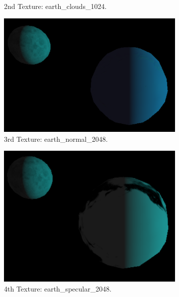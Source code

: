 \documentclass[12pt]{article}
\begin{document}
\begin{figure}[!h]
\begin{subfigure}{.4\textwidth}
        \caption{2nd Texture: earth\_clouds\_1024.}
        \label{fig:ex_37_2_extra}
    \end{subfigure}
    \begin{subfigure}{.4\textwidth}
        \centering
        \includegraphics[width = \textwidth]{figs/ex_37_3_extra.png}
        \caption{3rd Texture: earth\_normal\_2048.}
        \label{fig:ex_37_3_extra}
    \end{subfigure}
    \begin{subfigure}{.4\textwidth}
        \centering
        \includegraphics[width = \textwidth]{figs/ex_37_4_extra.png}
        \caption{4th Texture: earth\_specular\_2048.}
        \label{fig:ex_37_4_extra}
    \end{subfigure}
    \begin{subfigure}{.4\textwidth}

\end{subfigure}
\end{figure}
\end{document}
